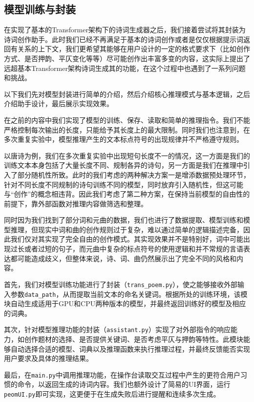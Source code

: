 \subsection{模型训练与封装}
在实现了基本的Transformer架构下的诗词生成器之后，我们接着尝试将其封装为诗词创作助手。此时我们已经不再满足于基本的诗词创作或者是仅仅根据提示词返回有关系的上下文，我们更希望其能够在用户设计的一定的格式要求下（比如创作方式、是否押韵、平仄变化等等）尽可能创作出丰富多变的内容，这实际上提出了远超基本Transformer架构诗词生成其的功能，在这个过程中也遇到了一系列问题和挑战。

以下我们先对模型封装进行简单的介绍，然后介绍核心推理模式与基本逻辑，之后介绍助手设计，最后展示实现效果。

在之前的内容中我们实现了模型的训练、保存、读取和简单的推理指令。我们不能严格控制每次输出的长度，只能给予其长度上的最大限制。同时我们也注意到，在多次重复实验中，模型推理产生的文本标点符号的出现规律并不严格遵守规则。

以唐诗为例，我们在多次重复实验中出现短句长度不一的情况，这一方面是我们的训练文本本身包括了大量长度不同、规制各异的诗句，另一方面是我们在推理中引入了部分随机性所致。此时的我们考虑的两种解决方案一是增添数据预处理环节，针对不同长度不同规制的诗句训练不同的模型，同时放弃引入随机性，但这可能与“创作”的概念相违背。因此我们考虑了第二种方案，在保持当前模型的自由性的前提下，靠外部函数对推理内容做筛选和整理。

同时因为我们找到了部分词和元曲的数据，我们也进行了数据提取、模型训练和模型推理，但现实中词和曲的创作规则过于复杂，难以通过简单的逻辑描述完备，因此我们仅对其实现了完全自由的创作模式。其实现效果并不是特别好，词中可能出现过长或者过短的句子，而元曲中复杂的标点符号的使用逻辑和并不常规的言语表达都可能造成歧义，但整体来说，诗、词、曲仍然展示出了完全不同的风格和内容。

首先，我们对模型训练功能进行了封装（\texttt{trans\_poem.py}），使之能够接收外部输入参数\texttt{data\_path}，从而提取当前文本的命名关键词。根据所处的训练环境，该模块自动生成适用于GPU和CPU两种版本的模型，并最终返回训练好的模型及相应的词典。

其次，针对模型推理功能的封装（\texttt{assistant.py}）实现了对外部指令的响应能力，如创作题材的选择、是否提供关键词、是否考虑平仄与押韵等特性。此模块能够自动选择合适的模型、词典以及推理函数来执行推理过程，并最终反馈能否实现用户要求及具体的推理结果。

最后，在\texttt{main.py}中调用推理功能，在操作台读取交互过程中产生的更符合用户习惯的命令，以返回生成的诗词内容。我们也额外设计了简易的UI界面，运行\texttt{peomUI.py}即可实现，这更便于在生成失败后进行提醒和连续多次生成。

